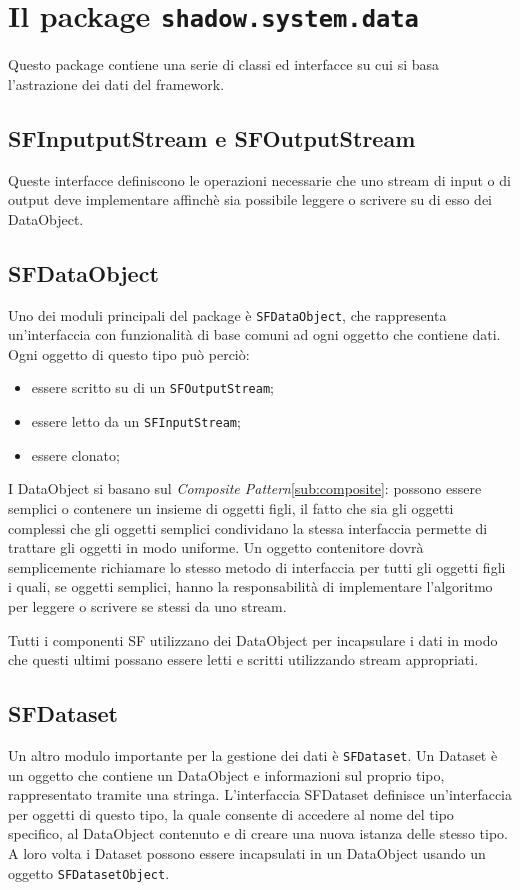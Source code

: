 

\section{Il package \texttt{shadow.system.data}}
\label{sec:shadow_system_data}
Questo package contiene una serie di classi ed interfacce su cui si basa l'astrazione dei dati del framework.

\subsection{SFInputputStream e SFOutputStream}
\label{sub:sfinoutstream}
Queste interfacce definiscono le operazioni necessarie che uno stream di input o di output deve implementare affinchè sia possibile leggere o scrivere su di esso dei DataObject.

\subsection{SFDataObject}
\label{sub:sfdataobject}
Uno dei moduli principali del package è \texttt{SFDataObject}, che rappresenta un'interfaccia con funzionalità di base comuni ad ogni oggetto che contiene dati. 
Ogni oggetto di questo tipo può perciò:
\begin{itemize}
	\item essere scritto su di un \texttt{SFOutputStream};
	\item essere letto da un \texttt{SFInputStream};
	\item essere clonato;
\end{itemize}
I DataObject si basano sul \textit{Composite Pattern}\ref{sub:composite}: possono essere semplici o contenere un insieme di oggetti figli, il fatto che sia gli oggetti complessi che gli oggetti semplici condividano la stessa interfaccia permette di trattare gli oggetti in modo uniforme. Un oggetto contenitore dovrà semplicemente richiamare lo stesso metodo di interfaccia per tutti gli oggetti figli i quali, se oggetti semplici, hanno la responsabilità di implementare l'algoritmo per leggere o scrivere se stessi da uno stream.

Tutti i componenti SF utilizzano dei DataObject per incapsulare i dati in modo che questi ultimi possano essere letti e scritti utilizzando stream appropriati.

\subsection{SFDataset}
\label{sub:sfdataset}
Un altro modulo importante per la gestione dei dati è \texttt{SFDataset}. Un Dataset è un oggetto che contiene un DataObject e informazioni sul proprio tipo, rappresentato tramite una stringa. 
L'interfaccia SFDataset definisce un'interfaccia per oggetti di questo tipo, la quale consente di accedere al nome del tipo specifico, al DataObject contenuto e di creare una nuova istanza delle stesso tipo.
A loro volta i Dataset possono essere incapsulati in un DataObject usando un oggetto \texttt{SFDatasetObject}.


